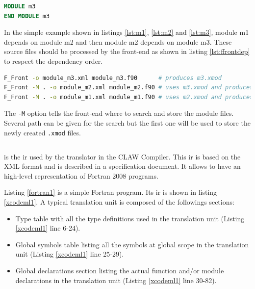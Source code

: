 \begin{lstlisting}[label=lst:m3, language=Fortran, caption=module\_m3.f90]
MODULE m3
END MODULE m3
\end{lstlisting}

In the simple example shown in listings \ref{lst:m1}, \ref{lst:m2} and
\ref{lst:m3}, module m1 depends on module m2 and then module m2
depends on module m3. These source files should be processed by the front-end
as shown in listing \ref{lst:ffrontdep} to respect the dependency order.

\begin{lstlisting}[label=lst:ffrontdep, language=Bash, caption=Parse module with dependencies]
F_Front -o module_m3.xml module_m3.f90      # produces m3.xmod
F_Front -M . -o module_m2.xml module_m2.f90 # uses m3.xmod and produces m2.xmod
F_Front -M . -o module_m1.xml module_m1.f90 # uses m2.xmod and produces m1.xmod
\end{lstlisting}

The \lstinline|-M| option tells the front-end where to search and store the 
module files. Several path can be given for the search but the first one will
be used to store the newly created \lstinline|.xmod| files.


\subsection{\xcodemlf}
\xcodemlf is the \gls{ir} used by the
translator in the CLAW Compiler. This \gls{ir} is based on the XML
format and is described in a specification 
document\cite{omni:xcodemlf95,omni:xcodemlf2008}. It allows to have an
high-level representation of Fortran 2008 programs.

Listing \ref{fortran1} is a simple Fortran program. Its \xcodemlf \gls{ir} is
shown in listing \ref{xcodeml1}. A typical \xcodemlf translation unit is
composed of the followings sections:
\begin{itemize}
\item Type table with all the type definitions used in the translation unit
(Listing \ref{xcodeml1} line 6-24).
\item Global symbols table listing all the symbols at global scope in the
translation unit (Listing
\ref{xcodeml1} line 25-29).
\item Global declarations section listing the actual function and/or module
declarations in the translation unit (Listing \ref{xcodeml1} line 30-82).
\end{itemize}

